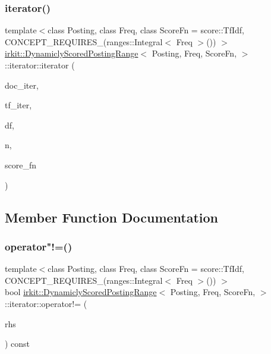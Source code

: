 \subsubsection{\texorpdfstring{iterator()}{iterator()}}
{\footnotesize\ttfamily template$<$class Posting, class Freq, class Score\+Fn = score\+::\+Tf\+Idf, C\+O\+N\+C\+E\+P\+T\+\_\+\+R\+E\+Q\+U\+I\+R\+E\+S\+\_\+(ranges\+::\+Integral$<$ Freq $>$()) $>$ \\
\hyperlink{classirkit_1_1DynamiclyScoredPostingRange}{irkit\+::\+Dynamicly\+Scored\+Posting\+Range}$<$ Posting, Freq, Score\+Fn, $>$\+::iterator\+::iterator (\begin{DoxyParamCaption}\item[{typename std\+::vector$<$ Doc $>$\+::const\+\_\+iterator}]{doc\+\_\+iter,  }\item[{typename std\+::vector$<$ Freq $>$\+::const\+\_\+iterator}]{tf\+\_\+iter,  }\item[{Freq}]{df,  }\item[{std\+::size\+\_\+t}]{n,  }\item[{Score\+Fn}]{score\+\_\+fn }\end{DoxyParamCaption})\hspace{0.3cm}{\ttfamily [inline]}}



\subsection{Member Function Documentation}
\mbox{\label{classirkit_1_1DynamiclyScoredPostingRange_1_1iterator_a37c62809d2e9dd22e2be51833bf9de38}} 
\subsubsection{\texorpdfstring{operator"!=()}{operator!=()}}
{\footnotesize\ttfamily template$<$class Posting, class Freq, class Score\+Fn = score\+::\+Tf\+Idf, C\+O\+N\+C\+E\+P\+T\+\_\+\+R\+E\+Q\+U\+I\+R\+E\+S\+\_\+(ranges\+::\+Integral$<$ Freq $>$()) $>$ \\
bool \hyperlink{classirkit_1_1DynamiclyScoredPostingRange}{irkit\+::\+Dynamicly\+Scored\+Posting\+Range}$<$ Posting, Freq, Score\+Fn, $>$\+::iterator\+::operator!= (\begin{DoxyParamCaption}\item[{const \hyperlink{classirkit_1_1DynamiclyScoredPostingRange_1_1iterator}{iterator} \&}]{rhs }\end{DoxyParamCaption}) const\hspace{0.3cm}{\ttfamily [inline]}}

